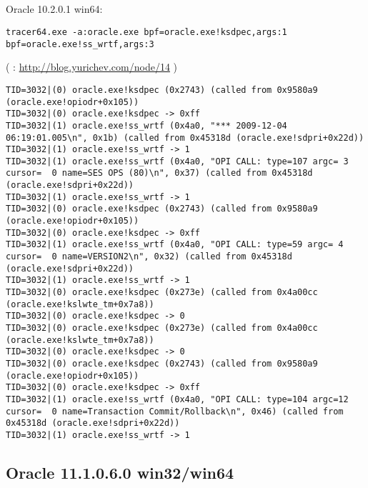 \subsection{}

 Oracle 10.2.0.1 win64:

\begin{lstlisting}
tracer64.exe -a:oracle.exe bpf=oracle.exe!ksdpec,args:1 bpf=oracle.exe!ss_wrtf,args:3
\end{lstlisting}

( : \url{http://blog.yurichev.com/node/14} )

\begin{lstlisting}
TID=3032|(0) oracle.exe!ksdpec (0x2743) (called from 0x9580a9 (oracle.exe!opiodr+0x105))
TID=3032|(0) oracle.exe!ksdpec -> 0xff
TID=3032|(1) oracle.exe!ss_wrtf (0x4a0, "*** 2009-12-04 06:19:01.005\n", 0x1b) (called from 0x45318d (oracle.exe!sdpri+0x22d))
TID=3032|(1) oracle.exe!ss_wrtf -> 1
TID=3032|(1) oracle.exe!ss_wrtf (0x4a0, "OPI CALL: type=107 argc= 3 cursor=  0 name=SES OPS (80)\n", 0x37) (called from 0x45318d (oracle.exe!sdpri+0x22d))
TID=3032|(1) oracle.exe!ss_wrtf -> 1
TID=3032|(0) oracle.exe!ksdpec (0x2743) (called from 0x9580a9 (oracle.exe!opiodr+0x105))
TID=3032|(0) oracle.exe!ksdpec -> 0xff
TID=3032|(1) oracle.exe!ss_wrtf (0x4a0, "OPI CALL: type=59 argc= 4 cursor=  0 name=VERSION2\n", 0x32) (called from 0x45318d (oracle.exe!sdpri+0x22d))
TID=3032|(1) oracle.exe!ss_wrtf -> 1
TID=3032|(0) oracle.exe!ksdpec (0x273e) (called from 0x4a00cc (oracle.exe!kslwte_tm+0x7a8))
TID=3032|(0) oracle.exe!ksdpec -> 0
TID=3032|(0) oracle.exe!ksdpec (0x273e) (called from 0x4a00cc (oracle.exe!kslwte_tm+0x7a8))
TID=3032|(0) oracle.exe!ksdpec -> 0
TID=3032|(0) oracle.exe!ksdpec (0x2743) (called from 0x9580a9 (oracle.exe!opiodr+0x105))
TID=3032|(0) oracle.exe!ksdpec -> 0xff
TID=3032|(1) oracle.exe!ss_wrtf (0x4a0, "OPI CALL: type=104 argc=12 cursor=  0 name=Transaction Commit/Rollback\n", 0x46) (called from 0x45318d (oracle.exe!sdpri+0x22d))
TID=3032|(1) oracle.exe!ss_wrtf -> 1
\end{lstlisting}

\subsection{ Oracle 11.1.0.6.0 win32/win64}

